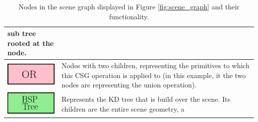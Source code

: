 \begin{table}
{\begin{tabular}{m{3cm}m{8cm}}
                                                                       sub tree
                                                                       rooted at
                                                                       the
                                                                       node. \\
      \midrule
     \includegraphics[scale=0.5]{img/2 art/or.png} & Nodes with two
                                                              children,
                                                              representing the
                                                              primitives to
                                                              which this CSG
                                                              operation is
                                                              applied to (in
                                                              this example, it
                                                              the two nodes are
                                                              representing the
                                                              union
                                                              operation). \\
      \midrule
     \includegraphics[scale=0.5]{img/2 art/bsp_node.png} & Represents
                                                                    the KD tree
                                                                    that is
                                                                    build over
                                                                    the
                                                                    scene. Its
                                                                    children are
                                                                    the entire
                                                                    scene
                                                                    geometry, a
      \\
      \bottomrule
    \end{tabular}}
  \caption{Nodes in the scene graph displayed in Figure \ref{fig:scene_graph} and their functionality.}
  \label{tab:nodes}
\end{table}


